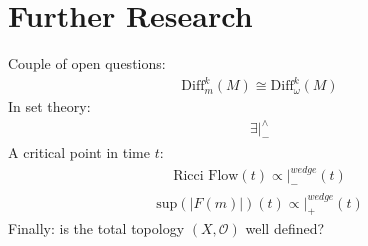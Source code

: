 \documentclass[10pt, oneside]{article}
\begin{document}
\section*{Further Research}
   Couple of open questions:
   \begin{align}
       \text{Diff}^k_m(M)\cong \text{Diff}_\omega^k (M)
   \end{align}
   In set theory:
   \begin{align}
       \exists |^{\wedge}_-
   \end{align}
   A critical point in time $t$:
   \begin{align}
       \text{Ricci Flow}(t) \propto |^{wedge}_-(t)
   \end{align}
   \begin{align}
       \text{sup}(|F(m)|)(t) \propto |^{wedge}_+ (t)
   \end{align}
   Finally: is the total topology $(X,\mathcal{O})$ well defined?
\end{document}
